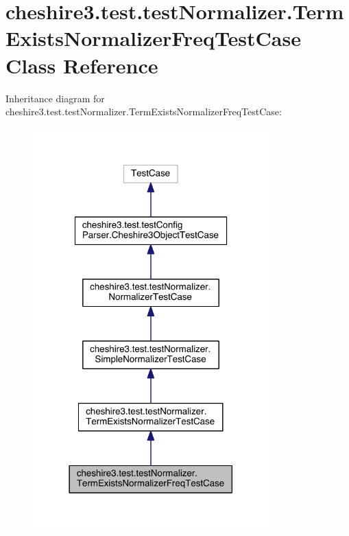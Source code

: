 \hypertarget{classcheshire3_1_1test_1_1test_normalizer_1_1_term_exists_normalizer_freq_test_case}{\section{cheshire3.\-test.\-test\-Normalizer.\-Term\-Exists\-Normalizer\-Freq\-Test\-Case Class Reference}
\label{classcheshire3_1_1test_1_1test_normalizer_1_1_term_exists_normalizer_freq_test_case}
}


Inheritance diagram for cheshire3.\-test.\-test\-Normalizer.\-Term\-Exists\-Normalizer\-Freq\-Test\-Case\-:
\nopagebreak
\begin{figure}[H]
\begin{center}
\leavevmode
\includegraphics[width=258pt]{classcheshire3_1_1test_1_1test_normalizer_1_1_term_exists_normalizer_freq_test_case__inherit__graph}
\end{center}
\end{figure}


